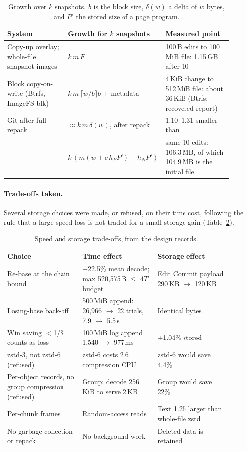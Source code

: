 \begin{table}[h]
\centering
\small
\begin{tabular}{p{0.30\linewidth} p{0.27\linewidth} p{0.33\linewidth}}
\toprule
System & Growth for $k$ snapshots & Measured point \\
\midrule
Copy-up overlay; whole-file snapshot images & $k\,m\,F$ & 100\,B edits to 100\,MiB file: 1.15\,GB after 10 \\
Block copy-on-write (Btrfs, ImageFS-blk) & $k\,m\,\lceil w/b\rceil b$ $+$ metadata & 4\,KiB change to 512\,MiB file: about 36\,KiB (Btrfs; recovered report) \\
Git after full repack & $\approx k\,m\,\delta(w)$, after repack & 1.10--1.31\X{} smaller than \sys{} \\
\sys{} & $k\,(m(w + c\,h_F P') + h_N P')$ & same 10 edits: 106.3\,MB, of which 104.9\,MB is the initial file \\
\bottomrule
\end{tabular}
\caption{Growth over $k$ snapshots. $b$ is the block size, $\delta(w)$ a delta of $w$
bytes, and $P'$ the stored size of a page program.}
\label{tab:ksnap}
\end{table}

\paragraph{Trade-offs taken.} Several storage choices were made, or refused, on their
time cost, following the rule that a large speed loss is not traded for a small storage
gain (Table~\ref{tab:tradeoffs}).

\begin{table}[h]
\centering
\small
\begin{tabular}{p{0.30\linewidth} p{0.30\linewidth} p{0.30\linewidth}}
\toprule
Choice & Time effect & Storage effect \\
\midrule
Re-base at the chain bound & $+$22.5\% mean decode; max 520,575\,B $\leq$ 4$T$ budget & Edit Commit payload 290\,KB $\rightarrow$ 120\,KB \\
Losing-base back-off & 500\,MiB append: 26,966 $\rightarrow$ 22 trials, 7.9 $\rightarrow$ 5.5\,s & Identical bytes \\
Win saving $<$1/8 counts as loss & 100\,MiB log append 1,540 $\rightarrow$ 977\,ms & $+$1.04\% stored \\
zstd-3, not zstd-6 (refused) & zstd-6 costs 2.6\X{} compression CPU & zstd-6 would save 4.4\% \\
Per-object records, no group compression (refused) & Group: decode 256\,KiB to serve 2\,KB & Group would save 22\% \\
Per-chunk frames & Random-access reads & Text 1.25\X{} larger than whole-file zstd \\
No garbage collection or repack & No background work & Deleted data is retained \\
\bottomrule
\end{tabular}
\caption{Speed and storage trade-offs, from the design records.}
\label{tab:tradeoffs}
\end{table}
